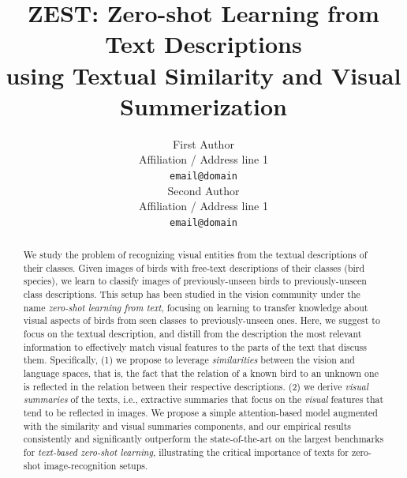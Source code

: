 \documentclass[11pt,a4paper]{article}
\title{ZEST: Zero-shot Learning from Text Descriptions\\ %
using Textual Similarity and Visual Summerization}
\author{First Author \\
  Affiliation / Address line 1 \\
  \texttt{email@domain} \\\And
  Second Author \\
  Affiliation / Address line 1 \\
  \texttt{email@domain} \\}
\date{}
\begin{document}
\maketitle


\begin{abstract}



We study the problem of recognizing visual entities from the textual descriptions of their classes. Given images of birds with free-text descriptions of their classes (bird species), we learn to classify images of previously-unseen birds to   previously-unseen class descriptions. This setup has been studied in the vision community under the name {\em zero-shot learning from text}, focusing on learning to transfer knowledge about visual aspects of birds from seen classes to previously-unseen ones. Here, we suggest to focus on the textual description, 
%
and distill from the description the most relevant information to effectively match visual features to the parts of the text that discuss them. 
Specifically,  %
(1) we propose to leverage {\em similarities} between the vision and language spaces, that is,  the fact that %
the relation of a known bird to an unknown one is reflected in the relation between their respective descriptions. 
(2) we derive {\em visual summaries} of the texts, i.e.,  %
extractive summaries that focus on the {\em visual} features that tend to be reflected in images.
We propose a simple attention-based model augmented with   the  similarity and visual summaries components, and our empirical results  consistently and significantly outperform the state-of-the-art on the largest benchmarks for {\em text-based zero-shot learning}, illustrating the critical importance of texts for zero-shot image-recognition setups.




\end{abstract}
\end{document}
